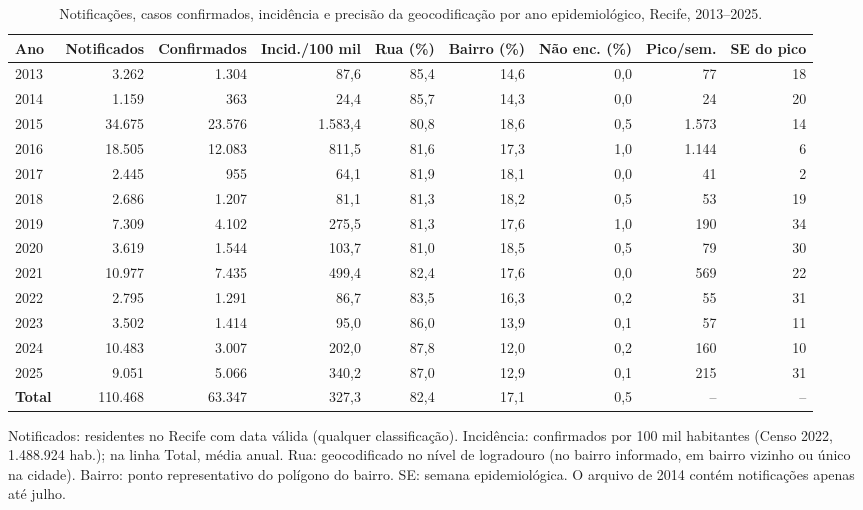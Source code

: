 \begin{table}[htbp]
\centering
\small
\caption{Notificações, casos confirmados, incidência e precisão da geocodificação por ano epidemiológico, Recife, 2013--2025.}
\label{tab:casos}
\begin{adjustbox}{max width=\linewidth}
\begin{tabular}{lrrrrrrrr}
\toprule
Ano & Notificados & Confirmados & Incid./100 mil & Rua (\%) & Bairro (\%) & Não enc. (\%) & Pico/sem. & SE do pico \\
\midrule
2013 & 3.262 & 1.304 & 87,6 & 85,4 & 14,6 & 0,0 & 77 & 18 \\
2014 & 1.159 & 363 & 24,4 & 85,7 & 14,3 & 0,0 & 24 & 20 \\
2015 & 34.675 & 23.576 & 1.583,4 & 80,8 & 18,6 & 0,5 & 1.573 & 14 \\
2016 & 18.505 & 12.083 & 811,5 & 81,6 & 17,3 & 1,0 & 1.144 & 6 \\
2017 & 2.445 & 955 & 64,1 & 81,9 & 18,1 & 0,0 & 41 & 2 \\
2018 & 2.686 & 1.207 & 81,1 & 81,3 & 18,2 & 0,5 & 53 & 19 \\
2019 & 7.309 & 4.102 & 275,5 & 81,3 & 17,6 & 1,0 & 190 & 34 \\
2020 & 3.619 & 1.544 & 103,7 & 81,0 & 18,5 & 0,5 & 79 & 30 \\
2021 & 10.977 & 7.435 & 499,4 & 82,4 & 17,6 & 0,0 & 569 & 22 \\
2022 & 2.795 & 1.291 & 86,7 & 83,5 & 16,3 & 0,2 & 55 & 31 \\
2023 & 3.502 & 1.414 & 95,0 & 86,0 & 13,9 & 0,1 & 57 & 11 \\
2024 & 10.483 & 3.007 & 202,0 & 87,8 & 12,0 & 0,2 & 160 & 10 \\
2025 & 9.051 & 5.066 & 340,2 & 87,0 & 12,9 & 0,1 & 215 & 31 \\
\midrule
\textbf{Total} & 110.468 & 63.347 & 327,3 & 82,4 & 17,1 & 0,5 & -- & -- \\
\bottomrule
\end{tabular}
\end{adjustbox}
\par\smallskip\begin{minipage}{0.95\linewidth}\footnotesize Notificados: residentes no Recife com data válida (qualquer classificação). Incidência: confirmados por 100 mil habitantes (Censo 2022, 1.488.924 hab.); na linha Total, média anual. Rua: geocodificado no nível de logradouro (no bairro informado, em bairro vizinho ou único na cidade). Bairro: ponto representativo do polígono do bairro. SE: semana epidemiológica. O arquivo de 2014 contém notificações apenas até julho.\end{minipage}
\end{table}
